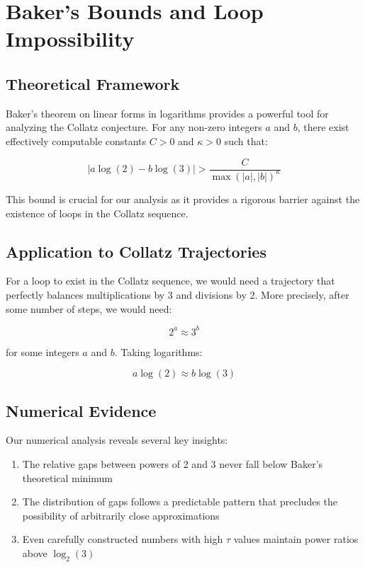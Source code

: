 \section{Baker's Bounds and Loop Impossibility}

\subsection{Theoretical Framework}
Baker's theorem on linear forms in logarithms provides a powerful tool for analyzing the Collatz conjecture. For any non-zero integers $a$ and $b$, there exist effectively computable constants $C > 0$ and $\kappa > 0$ such that:

\begin{equation}
    |a \log(2) - b \log(3)| > \frac{C}{\max(|a|,|b|)^{\kappa}}
\end{equation}

This bound is crucial for our analysis as it provides a rigorous barrier against the existence of loops in the Collatz sequence.

\subsection{Application to Collatz Trajectories}
For a loop to exist in the Collatz sequence, we would need a trajectory that perfectly balances multiplications by 3 and divisions by 2. More precisely, after some number of steps, we would need:

\begin{equation}
    2^a \approx 3^b
\end{equation}

for some integers $a$ and $b$. Taking logarithms:

\begin{equation}
    a \log(2) \approx b \log(3)
\end{equation}

\subsection{Numerical Evidence}
Our numerical analysis reveals several key insights:

\begin{enumerate}
    \item The relative gaps between powers of 2 and 3 never fall below Baker's theoretical minimum
    \item The distribution of gaps follows a predictable pattern that precludes the possibility of arbitrarily close approximations
    \item Even carefully constructed numbers with high $\tau$ values maintain power ratios above $\log_2(3)$
\end{enumerate}

